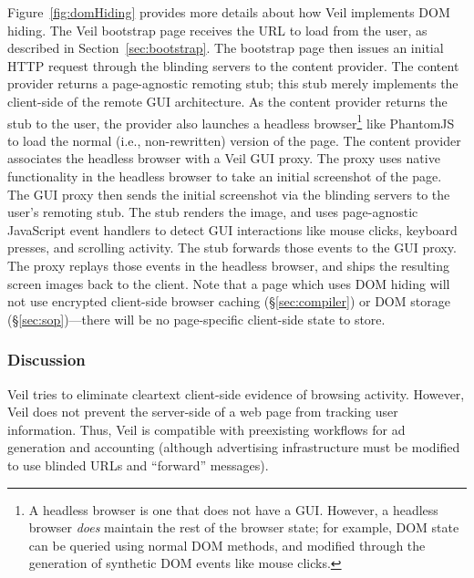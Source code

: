 Figure~\ref{fig:domHiding} provides more details about how Veil
implements DOM hiding. The Veil bootstrap page receives the
URL to load from the user, as described in Section~\ref{sec:bootstrap}.
The bootstrap page then issues an initial HTTP request through
the blinding servers to the content provider.
The content provider returns a page-agnostic remoting stub;
this stub merely implements the client-side of the remote
GUI architecture. As the content provider returns the stub
to the user, the provider also launches a headless browser\footnote{A
	headless browser is one that does not have a GUI. However, a
	headless browser \emph{does} maintain the rest of the browser
	state; for example, DOM state can be queried using normal DOM
	methods, and modified through the generation of synthetic DOM
	events like mouse clicks.} like PhantomJS~\cite{phantomJS} to load
the normal (i.e., non-rewritten) version of the page. The
content provider associates the headless browser with a Veil
GUI proxy. The proxy uses native functionality in the headless
browser to take an initial screenshot of the page. The GUI
proxy then sends the initial screenshot via the blinding servers
to the user's remoting stub. The stub renders the image, and
uses page-agnostic JavaScript event handlers to detect
GUI interactions like mouse clicks, keyboard presses, and
scrolling activity. The stub forwards those events to the GUI
proxy. The proxy replays those events in the headless
browser, and ships the resulting screen images back to the
client. Note that a page which uses DOM hiding will not
use encrypted client-side browser caching (\S\ref{sec:compiler})
or DOM storage (\S\ref{sec:sop})---there
will be no page-specific client-side state to store.

\subsubsection{Discussion}
\label{sec:discussion}

Veil tries to eliminate cleartext client-side
evidence of browsing activity. However, Veil does
not prevent the server-side of a web page from
tracking user information. Thus, Veil is compatible
with preexisting workflows for ad generation and
accounting (although advertising infrastructure
must be modified to use blinded URLs and
``forward'' messages).

%

